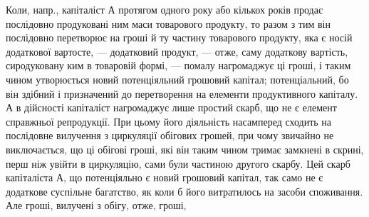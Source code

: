Коли, напр., капіталіст $А$ протягом одного року або кількох років продає послідовно продуковані ним
маси товарового продукту, то разом з тим він послідовно перетворює на гроші й ту частину товарового
продукту, яка є носій додаткової вартосте, — додатковий продукт, — отже, саму додаткову вартість,
сиродуковану ким в товаровій формі, — помалу нагромаджує ці гроші, і таким чином утворюється новий
потенціяльний грошовий капітал; потенціальний, бо він здібний і призначений до перетворення на
елементи продуктивного капіталу. А в дійсності капіталіст нагромаджує лише простий скарб, що не є
елемент справжньої репродукції. При цьому його діяльність насамперед сходить на послідовне вилучення
з циркуляції обігових грошей, при чому звичайно не виключається, що ці обігові гроші, які він таким
чином тримає замкнені в скрині, перш ніж увійти в циркуляцію, сами були частиною другого скарбу. Цей
скарб капіталіста $А$, що потенціяльно є новий грошовий капітал, так само не є додаткове суспільне
багатство, як коли б його витратилось на засоби споживання. Але гроші, вилучені з обігу, отже,
гроші,
\parbreak{}  %
